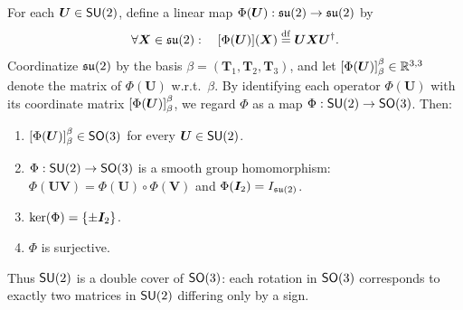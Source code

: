 \documentclass[11pt,reqno]{amsart}
\begin{document}
\begin{Thm}\label{thm:su2-double-cover}
For each $\bm U\in\operatorname{\mathsf{SU}}(2)$, define a linear map
$\Phi(\bm U):\mathfrak{su}(2)\to\mathfrak{su}(2)$ by
\[
\forall\bm X\in\su(2):\quad
\FUNC{\Phi(\bm U)}{\bm X}\df\bm U\bm X\bm U\herm.
\]
Coordinatize $\mathfrak{su}(2)$ by the basis $\beta=(\bm T_1,\bm T_2,\bm T_3)$,
and let $\SqBr{\Phi(\bm U)}_\beta^\beta\in\R^{3,3}$ denote the matrix of
$\Phi(\bm U)$ w.r.t.\ $\beta$.
By identifying each operator $\Phi(\bm U)$ with its coordinate matrix
$\SqBr{\Phi(\bm U)}_\beta^\beta$, we regard $\Phi$ as a map
$\Phi:\operatorname{\mathsf{SU}}(2)\to\operatorname{\mathsf{SO}}(3)$.  Then:
\begin{enumerate}
\item $\SqBr{\Phi(\bm U)}_\beta^\beta\in\SO(3)$ for every $\bm U\in\operatorname{\mathsf{SU}}(2)$.
\item $\Phi:\operatorname{\mathsf{SU}}(2)\to\operatorname{\mathsf{SO}}(3)$ is a smooth group homomorphism:
$\Phi(\bm U\bm V)=\Phi(\bm U)\circ\Phi(\bm V)$ and
$\Phi(\bm I_2)=I_{\mathfrak{su}(2)}$.
\item $\ker\Br{\Phi}=\set{\pm\bm I_2}$.
\item $\Phi$ is surjective.
\end{enumerate}
Thus $\operatorname{\mathsf{SU}}(2)$ is a double cover of $\operatorname{\mathsf{SO}}(3)$: each rotation in $\operatorname{\mathsf{SO}}(3)$
corresponds to exactly two matrices in $\operatorname{\mathsf{SU}}(2)$ differing only by a sign.
\end{Thm}
\end{document}
